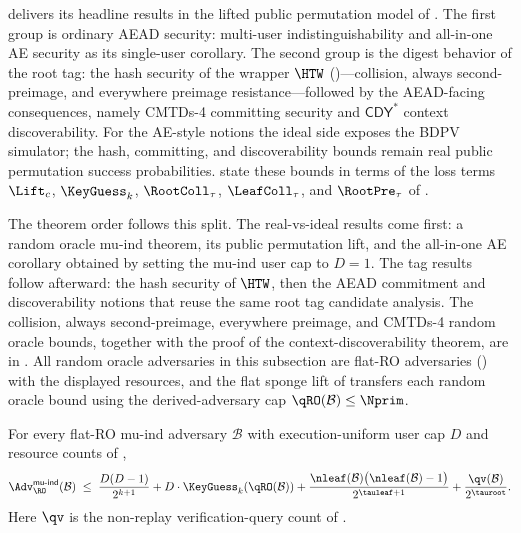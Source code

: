\TW{} delivers its headline results in the lifted public permutation model of
. The first group is ordinary AEAD security: multi-user
indistinguishability \cite{BT16} and all-in-one AE security \cite{RS06} as its
single-user corollary. The second group is the digest behavior of the root tag:
the \cite{RS04} hash security of the wrapper $\HTW$ ()---collision,
always second-preimage, and everywhere preimage resistance---followed by the
AEAD-facing consequences, namely \cite{BH22} CMTDs-4 committing security and
\cite{MLGR23} $\mathsf{CDY}^\ast$ context discoverability. For the AE-style
notions the ideal side exposes the BDPV simulator; the hash, committing, and
discoverability bounds remain real public permutation success probabilities.
state these bounds in terms of the loss terms $\Lift_c$, $\KeyGuess_k$,
$\RootColl_\tau$, $\LeafColl_\tau$, and $\RootPre_\tau$ of
.

The theorem order follows this split. The real-vs-ideal results come first: a
random oracle mu-ind theorem, its public permutation lift, and the all-in-one AE
corollary obtained by setting the mu-ind user cap to $D=1$. The tag results
follow afterward: the hash security of $\HTW$, then the AEAD commitment and
discoverability notions that reuse the same root tag candidate analysis. The
collision, always second-preimage, everywhere preimage, and CMTDs-4 random
oracle bounds, together with the proof of the context-discoverability theorem,
are in .
All random oracle adversaries in this subsection are flat-RO adversaries
() with the displayed resources, and the
flat sponge lift of  transfers each random
oracle bound using the derived-adversary cap
$\qRO(\mathcal{B}) \leq \Nprim$.

\begin{theorem}
\label{thm:mu-ind-ro}
For every flat-RO mu-ind adversary $\mathcal{B}$ with
execution-uniform user cap $D$ and resource counts of
,
\[
  \Adv^{\mathsf{mu\text{-}ind}}_{\RO}(\mathcal{B})
  \;\leq\;
  \frac{D(D - 1)}{2^{k + 1}}
  + D \cdot \KeyGuess_k(\qRO(\mathcal{B}))
  + \frac{\nleaf(\mathcal{B})\bigl(\nleaf(\mathcal{B}) - 1\bigr)}
         {2^{\tauleaf + 1}}
  + \frac{\qv(\mathcal{B})}{2^{\tauroot}}.
\]
Here $\qv$ is the non-replay verification-query count of
.
\end{theorem}

